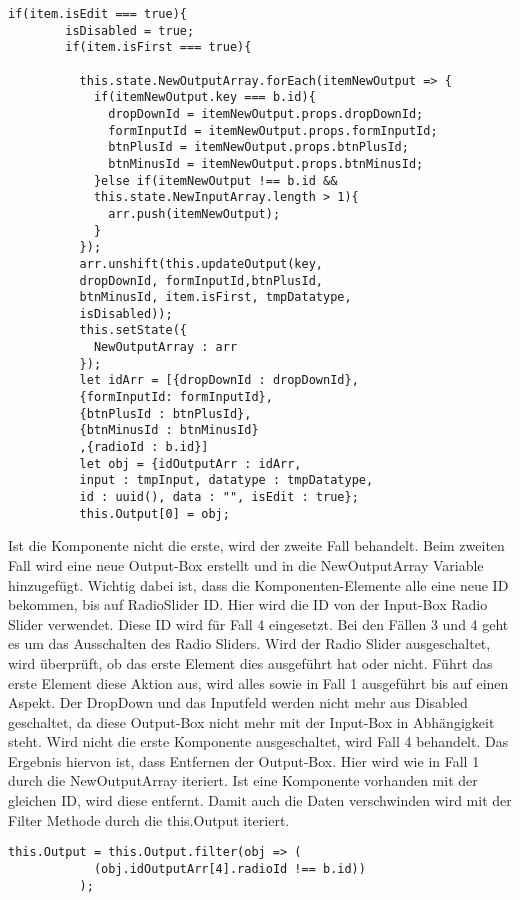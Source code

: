 \documentclass[a4paper,11pt]{scrreprt}
\begin{document}
\begin{lstlisting}
if(item.isEdit === true){
        isDisabled = true;
        if(item.isFirst === true){
          
          this.state.NewOutputArray.forEach(itemNewOutput => {
            if(itemNewOutput.key === b.id){
              dropDownId = itemNewOutput.props.dropDownId;
              formInputId = itemNewOutput.props.formInputId;
              btnPlusId = itemNewOutput.props.btnPlusId;
              btnMinusId = itemNewOutput.props.btnMinusId;
            }else if(itemNewOutput !== b.id &&
            this.state.NewInputArray.length > 1){
              arr.push(itemNewOutput);
            }
          });
          arr.unshift(this.updateOutput(key,
          dropDownId, formInputId,btnPlusId,
          btnMinusId, item.isFirst, tmpDatatype,
          isDisabled));
          this.setState({
            NewOutputArray : arr
          });
          let idArr = [{dropDownId : dropDownId},
          {formInputId: formInputId},
          {btnPlusId : btnPlusId},
          {btnMinusId : btnMinusId}
          ,{radioId : b.id}]
          let obj = {idOutputArr : idArr,
          input : tmpInput, datatype : tmpDatatype,
          id : uuid(), data : "", isEdit : true};
          this.Output[0] = obj;
\end{lstlisting}
Ist die Komponente nicht die erste, wird der zweite Fall behandelt. Beim zweiten Fall wird eine neue Output-Box erstellt und in die NewOutputArray Variable hinzugefügt. Wichtig dabei ist, dass die Komponenten-Elemente alle eine neue ID bekommen, bis auf RadioSlider ID. Hier wird die ID von der Input-Box Radio Slider verwendet. Diese ID wird für Fall 4 eingesetzt. Bei den Fällen 3 und 4 geht es um das Ausschalten des Radio Sliders.
Wird der Radio Slider ausgeschaltet, wird überprüft, ob das erste Element dies ausgeführt hat oder nicht. Führt das erste Element diese Aktion aus, wird alles sowie in Fall 1 ausgeführt bis auf einen Aspekt. Der DropDown und das Inputfeld werden nicht mehr aus Disabled geschaltet, da diese Output-Box nicht mehr mit der Input-Box in Abhängigkeit steht. 
Wird nicht die erste Komponente ausgeschaltet, wird Fall 4 behandelt. Das Ergebnis hiervon ist, dass Entfernen der Output-Box. Hier wird wie in Fall 1 durch die NewOutputArray iteriert. Ist eine Komponente vorhanden mit der gleichen ID, wird diese entfernt. Damit auch die Daten verschwinden wird mit der Filter Methode durch die this.Output iteriert. 
\begin{lstlisting}
this.Output = this.Output.filter(obj => (
            (obj.idOutputArr[4].radioId !== b.id))
          );
\end{lstlisting}
\end{document}
